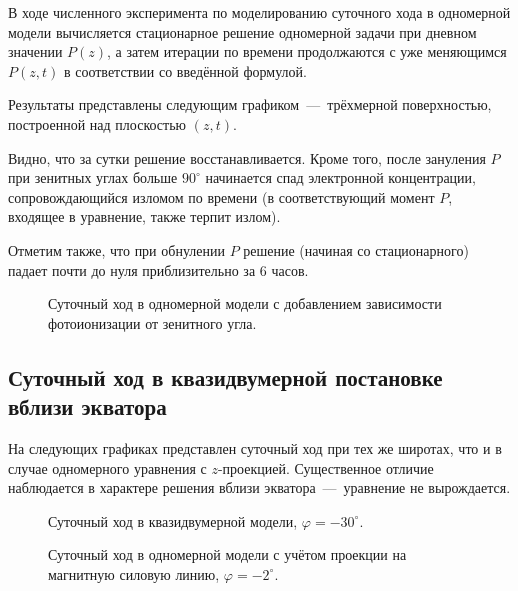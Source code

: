 \documentclass[14pt, a4paper, fleqn]{extarticle}
\begin{document}
В ходе численного эксперимента по моделированию суточного хода в одномерной модели вычисляется стационарное решение одномерной задачи при дневном значении $P(z)$, а затем итерации по времени продолжаются с уже меняющимся $P(z, t)$ в соответствии со введённой формулой.

Результаты представлены следующим графиком~---~трёхмерной поверхностью, построенной над плоскостью $(z, t)$.

Видно, что за сутки решение восстанавливается. Кроме того, после зануления $P$ при зенитных углах больше $90^\circ$ начинается спад электронной концентрации, сопровождающийся изломом по времени (в соответствующий  момент $P$, входящее в уравнение, также терпит излом).

Отметим также, что при обнулении $P$ решение (начиная со стационарного) падает почти до нуля приблизительно за $6$ часов.

\begin{figure}[H]
\caption{Суточный ход в одномерной модели с добавлением зависимости фотоионизации от зенитного угла.}
\end{figure}

\subsection{Суточный ход в квазидвумерной постановке вблизи экватора}


На следующих графиках представлен суточный ход при тех же широтах, что и в случае одномерного уравнения с $z$-проекцией. Существенное отличие наблюдается в характере решения вблизи экватора~---~уравнение не вырождается.


\begin{figure}[H]
\caption{Суточный ход в квазидвумерной модели, $\varphi = -30^\circ$.}
\end{figure}

\begin{figure}[H]
\caption{Суточный ход в одномерной модели с учётом проекции на магнитную силовую линию, $\varphi = -2^\circ$.}
\end{figure}
\end{document}
